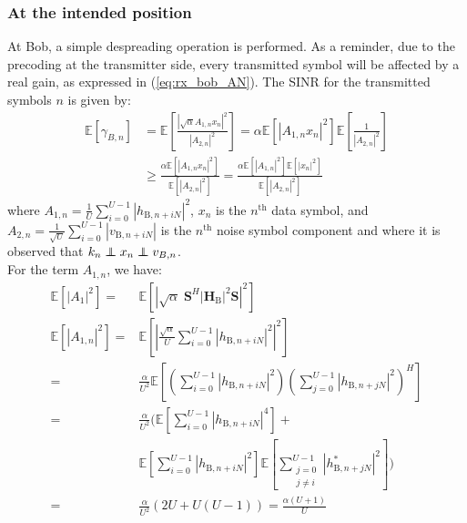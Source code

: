 \documentclass[journal,comsoc]{IEEEtran}
\newcommand{\module}[1]{\left|#1\right|}
\newcommand{\EX}[1]{\mathbb{E} \left[#1\right]}%
\newcommand{\HB}{\textbf{H}_{\text{B}}}
\newcommand{\spread}{\textbf{S}}
\newcommand\independent{\protect\mathpalette{\protect\independenT}{\perp}}
\def\independenT#1#2{\mathrel{\rlap{$#1#2$}\mkern2mu{#1#2}}}
\begin{document}
\subsubsection{At the intended position}
At Bob, a simple despreading operation is performed. As a reminder, due to the precoding at the transmitter side, every transmitted symbol will be affected by a real gain, as expressed in (\ref{eq:rx_bob_AN}). The SINR for the transmitted symbols $n$ is given by:
\begin{equation}
\begin{split}
\EX{\gamma_{B,n}} &= \EX{ \frac{  \left| \sqrt{\alpha} A_{1,n} x_n \right|^2  }{  \left| A_{2,n} \right|^2} }  = \alpha \EX{\left| A_{1,n}  x_n\right|^2}  \EX{\frac{1}{\left| A_{2,n} \right|^2}}  \\
& \geq  \frac{\alpha \EX{  \left| A_{1,n}  x_n\right|^2 } }{\EX{ \left| A_{2,n} \right|^2 }} =  \frac{\alpha \EX{ \left| A_{1,n}  \right|^2 } \EX{ \left| x_n \right|^2 } }{\EX{ \left| A_{2,n} \right|^2 }}
\label{eq:RV_sinr_b}
\end{split}
\end{equation}
where $A_{1,n} = \frac{1}{U}\sum_{i=0}^{U-1} \left| h_{\text{B}, n + iN}\right|^2$, $x_n$ is the $n^{\text{th}}$ data symbol, and $A_{2,n} = \frac{1}{\sqrt{U}}\sum_{i=0}^{U-1} \left| v_{\text{B}, n + iN}\right|$ is the $n^{\text{th}}$ noise symbol component and where it is observed that $k_n \independent x_n \independent v_{B,n}$.\\
For the term $A_{1,n}$, we have:
\begin{equation}
	\begin{split}
	\EX{|A_1|^2} =& \EX{\module{\sqrt{\alpha} \; \spread^H \module{\HB}^2 \spread}^2} \\
	\EX{|A_{1,n}|^2} =&\EX{\left|\frac{\sqrt{\alpha}}{U}\sum_{i=0}^{U-1} \left| h_{\text{B}, n + iN}\right|^2\right|^2}  \\
	=& \frac{\alpha}{U^2} \EX{\left(\sum_{i=0}^{U-1} \left| h_{\text{B}, n + iN}\right|^2\right) \left(\sum_{j=0}^{U-1} \left| h_{\text{B}, n + jN}\right|^2\right)^H}\\
	=&  \frac{\alpha}{U^2} \Big(\EX{\sum_{i=0}^{U-1}\left| h_{\text{B}, n + iN}\right|^4} +\\
	& \EX{\sum_{i=0}^{U-1}\left| h_{\text{B}, n + iN}\right|^2}\EX{\sum_{\substack{j=0 \\ j\neq i}}^{U-1} | h^*_{\text{B}, n + jN}|^2} \Big) \\
	=& \frac{\alpha}{U^2} \left( 2U + U(U-1)\right) = \frac{\alpha (U+1)}{U}
	\end{split}
	\label{eq:appA:data_bob}
\end{equation}
\end{document}
